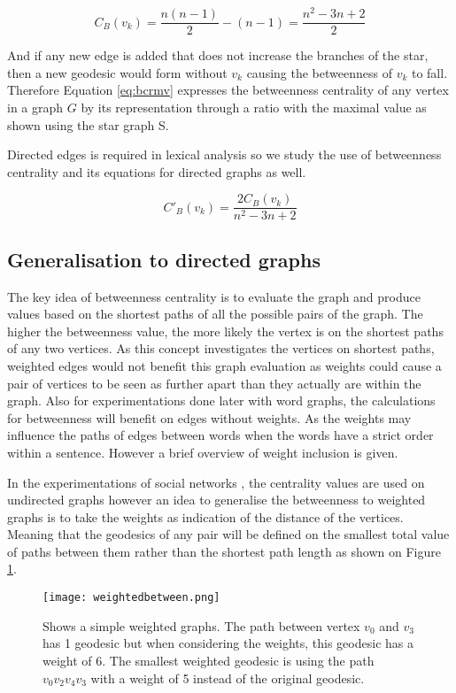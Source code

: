 \begin{equation}
C_B(v_k)= \frac{n(n-1)}{2} - (n-1) = \frac{n^2-3n+2}{2}
\end{equation}

And if any new edge is added that does not increase the branches of the star, then a new geodesic would form without $v_k$ causing the betweenness of $v_k$ to fall. Therefore Equation \ref{eq:bcrmv} expresses the betweenness centrality of any vertex in a graph $G$ by its representation through a ratio with the maximal value as shown using the star graph S.

Directed edges is required in lexical analysis so we study the use of betweenness centrality and its equations for directed graphs as well.

\begin{equation}\label{eq:bcrmv}
C'_B(v_k)= \frac{2C_B(v_k)}{n^2-3n+2}
\end{equation}

\subsection{Generalisation to directed graphs}
The key idea of betweenness centrality is to evaluate the graph and produce values based on the shortest paths of all the possible pairs of the graph. The higher the betweenness value, the more likely the vertex is on the shortest paths of any two vertices. As this concept investigates the vertices on shortest paths, weighted edges would not benefit this graph evaluation as weights could cause a pair of vertices to be seen as further apart than they actually are within the graph. Also for experimentations done later with word graphs, the calculations for betweenness will benefit on edges without weights. As the weights may influence the paths of edges between words when the words have a strict order within a sentence. However a brief overview of weight inclusion is given.

In the experimentations of social networks \cite{freeman1979centrality}, the centrality values are used on undirected graphs however an idea to generalise the betweenness to weighted graphs is to take the weights as indication of the distance of the vertices. Meaning that the geodesics of any pair will be defined on the smallest total value of paths between them rather than the shortest path length as shown on Figure \ref{fig:dbc}.

\begin{figure}[!htb]
	\centering
	\texttt{[image: weightedbetween.png]}
	\caption{Shows a simple weighted graphs. The path between vertex $v_0$ and $v_3$ has 1 geodesic but when considering the weights, this geodesic has a weight of 6. The smallest weighted geodesic is using the path $v_0v_2v_4v_3$ with a weight of 5 instead of the original geodesic. }
	\label{fig:dbc}
\end{figure}


